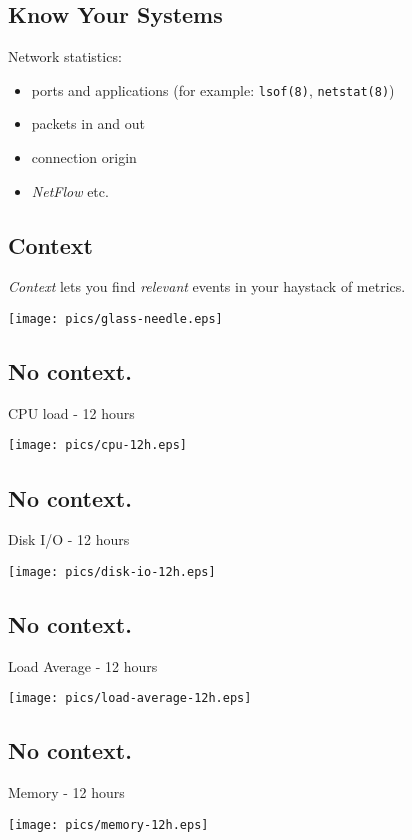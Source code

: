 \documentclass[xga]{xdvislides}
\begin{document}
\subsection{Know Your Systems}
Network statistics:
\begin{itemize}
	\item ports and applications (for example: {\tt lsof(8)}, {\tt netstat(8)})
	\item packets in and out
	\item connection origin
	\item {\em NetFlow} etc.
\end{itemize}

\subsection{Context}
{\em Context} lets you find {\em relevant} events in
your haystack of metrics.

\begin{center}
	\texttt{[image: pics/glass-needle.eps]}
\end{center}

\subsection{No context.}
CPU load - 12 hours
\begin{center}
	\texttt{[image: pics/cpu-12h.eps]}
\end{center}

\subsection{No context.}
Disk I/O - 12 hours
\begin{center}
	\texttt{[image: pics/disk-io-12h.eps]}
\end{center}

\subsection{No context.}
Load Average - 12 hours
\begin{center}
	\texttt{[image: pics/load-average-12h.eps]}
\end{center}

\subsection{No context.}
Memory - 12 hours
\begin{center}
	\texttt{[image: pics/memory-12h.eps]}
\end{center}
\end{document}
